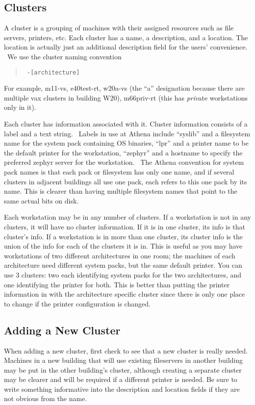 \subsection{Clusters}
A cluster is a grouping of machines with their assigned resources such
as file servers, printers, etc.  Each cluster has a name, a
description, and a location.  The location is actually just an
additional description field for the users' convenience.  \athena\ We
use the cluster naming convention
\begin{quotation}\tt
{}-[architecture]
\end{quotation}
For example, m11-vs, e40test-rt, w20a-vs (the ``a'' designation because
there are multiple vax clusters in building W20), m66priv-rt (this has
{\em priv}ate workstations only in it).

Each cluster has information associated with it.  Cluster information
consists of a label and a text string.  \athena\ Labels in use at
Athena include ``syslib'' and a filesystem name for the system pack
containing OS binaries, ``lpr'' and a printer name to be the default
printer for the workstation, ``zephyr'' and a hostname to specify the
preferred zephyr server for the workstation.  \athena\ The Athena
convention for system pack names is that each pack or filesystem has
only one name, and if several clusters in adjacent buildings all use
one pack, each refers to this one pack by its name.  This is clearer
than having multiple filesystem names that point to the same actual
bits on disk.

Each workstation may be in any number of clusters.  If a workstation
is not in any clusters, it will have no cluster information.  If it is
in one cluster, its info is that cluster's info.  If a workstation is
in more than one cluster, its cluster info is the union of the info
for each of the clusters it is in.  This is useful as you may have
workstations of two different architectures in one room; the machines
of each architecture need different system packs, but the same default
printer.  You can use 3 clusters: two each identifying system packs for
the two architectures, and one identifying the printer for both.  This
is better than putting the printer information in with the
architecture specific cluster since there is only one place to change
if the printer configuration is changed.

\subsection{Adding a New Cluster}
When adding a new cluster, first check to see that a new cluster is
really needed.  Machines in a new building that will use existing
fileservers in another building may be put in the other building's
cluster, although creating a separate cluster may be clearer and will
be required if a different printer is needed.  Be sure to write
something informative into the description and location fields if they
are not obvious from the name.

